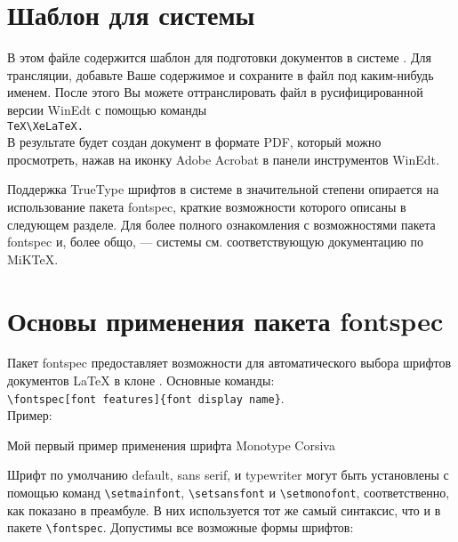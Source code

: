 \documentclass{article}
\begin{document}
\pagestyle{empty}

\section*{Шаблон для системы \XeLaTeX}

В этом файле содержится шаблон для подготовки документов в системе \XeLaTeX.
Для трансляции, добавьте Ваше содержимое и сохраните в файл под каким-нибудь
именем. После этого Вы можете оттранслировать файл в русифицированной версии
WinEdt с помощью
команды\\

\indent \verb|TeX\XeLaTeX.|\\

В результате будет создан документ в формате PDF, который можно просмотреть,
нажав на иконку Adobe Acrobat в панели инструментов WinEdt.

Поддержка TrueType шрифтов в системе  \XeLaTeX{} в значительной степени
опирается на использование пакета \textsf{fontspec}, краткие возможности
которого описаны в следующем разделе. Для более полного ознакомления с
возможностями пакета \textsf{fontspec} и, более общо, --- системы \XeLaTeX{}
см. соответствующую документацию по MiKTeX.

\section*{Основы применения пакета \textsf{fontspec}}

Пакет \textsf{fontspec} предоставляет возможности для автоматического выбора
шрифтов документов \LaTeX{} в клоне \XeTeX{}.
Основные команды:\\

\indent \verb|\fontspec[font features]{font display name}|.\\

Пример:

\begin{center}
  \Large
  Мой первый пример применения шрифта Monotype Corsiva
\end{center}

Шрифт по умолчанию default, sans serif, и typewriter могут быть установлены с
помощью команд \verb|\setmainfont|, \verb|\setsansfont| и
\verb|\setmonofont|, соответственно, как показано в преамбуле. В них
используется тот же самый синтаксис, что и в пакете \verb|\fontspec|.
Допустимы все возможные формы шрифтов:
\end{document}
